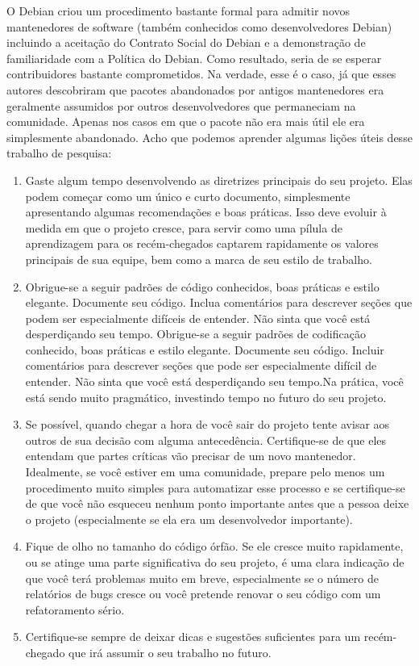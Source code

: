 O Debian criou um procedimento bastante formal para admitir novos mantenedores de
software (também conhecidos como desenvolvedores Debian) incluindo a aceitação do
Contrato Social do Debian e a demonstração de familiaridade com a Política do Debian.
Como resultado, seria de se esperar contribuidores bastante comprometidos. Na verdade,
esse é o caso, já que esses autores descobriram que pacotes abandonados por antigos
mantenedores era geralmente assumidos por outros desenvolvedores que permaneciam na
comunidade. Apenas nos casos em que o pacote não era mais útil ele era simplesmente
abandonado. Acho que podemos aprender algumas lições úteis desse trabalho de pesquisa:
\begin{enumerate}
 \item Gaste algum tempo desenvolvendo as diretrizes principais do seu projeto. Elas
 podem começar como um único e curto documento, simplesmente apresentando algumas
 recomendações e boas práticas. Isso deve evoluir à medida em que o projeto cresce,
 para servir como uma pílula de aprendizagem para os recém-chegados captarem rapidamente
 os valores principais de sua equipe, bem como a marca de seu estilo de trabalho.
 \item Obrigue-se a seguir padrões de código conhecidos, boas práticas e
estilo elegante. Documente seu código. Inclua comentários para descrever seções que
podem ser especialmente difíceis de entender. Não sinta que você está desperdiçando
seu tempo. Obrigue-se a seguir padrões de codificação conhecido, boas práticas e 
estilo elegante. Documente seu código. Incluir comentários para descrever seções
que pode ser especialmente difícil de entender. Não sinta que você está desperdiçando
seu tempo.Na prática, você está sendo muito pragmático, investindo tempo no futuro
do seu projeto.
 \item Se possível, quando chegar a hora de você sair do projeto tente avisar aos
 outros de sua decisão com alguma antecedência. Certifique-se de que eles entendam
 que partes críticas vão precisar de um novo mantenedor. Idealmente, se você estiver
 em uma comunidade, prepare pelo menos um procedimento muito simples para automatizar
 esse processo e se certifique-se de que você não esqueceu nenhum ponto importante
 antes que a pessoa deixe o projeto (especialmente se ela era um desenvolvedor importante).
 \item Fique de olho no tamanho do código órfão. Se ele cresce muito rapidamente, ou se
 atinge uma parte significativa do seu projeto, é uma clara indicação de que você terá
 problemas muito em breve, especialmente se o número de relatórios de bugs cresce ou
 você pretende renovar o seu código com um refatoramento sério.
 \item Certifique-se sempre de deixar dicas e sugestões suficientes para um recém-chegado
 que irá assumir o seu trabalho no futuro.
\end{enumerate}

